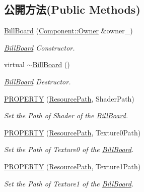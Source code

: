 \subsection*{公開方法(Public Methods)}
\begin{DoxyCompactItemize}
\item 
\hyperlink{class_i_dream_sky_1_1_bill_board_a484900d8c24d851cfccf6b435886a2a4}{Bill\+Board} (\hyperlink{class_i_dream_sky_1_1_component_1_1_owner}{Component\+::\+Owner} \&owner\+\_\+)
\begin{DoxyCompactList}\small\item\em \hyperlink{class_i_dream_sky_1_1_bill_board}{Bill\+Board} Constructor. \end{DoxyCompactList}\item 
virtual \hyperlink{class_i_dream_sky_1_1_bill_board_ab84fd0e03cde0a0f6444cc9d601bd99f}{$\sim$\+Bill\+Board} ()
\begin{DoxyCompactList}\small\item\em \hyperlink{class_i_dream_sky_1_1_bill_board}{Bill\+Board} Destructor. \end{DoxyCompactList}\item 
\hyperlink{class_i_dream_sky_1_1_bill_board_a023a1f651b53eb2f2888b62810c4dc57}{P\+R\+O\+P\+E\+R\+TY} (\hyperlink{class_i_dream_sky_1_1_resource_path}{Resource\+Path}, Shader\+Path)
\begin{DoxyCompactList}\small\item\em Set the Path of Shader of the \hyperlink{class_i_dream_sky_1_1_bill_board}{Bill\+Board}. \end{DoxyCompactList}\item 
\hyperlink{class_i_dream_sky_1_1_bill_board_a40f130cb61a2a0ed143d64f35288f5dd}{P\+R\+O\+P\+E\+R\+TY} (\hyperlink{class_i_dream_sky_1_1_resource_path}{Resource\+Path}, Texture0\+Path)
\begin{DoxyCompactList}\small\item\em Set the Path of Texture0 of the \hyperlink{class_i_dream_sky_1_1_bill_board}{Bill\+Board}. \end{DoxyCompactList}\item 
\hyperlink{class_i_dream_sky_1_1_bill_board_a279538a790562d64c5c574b7e38d1db1}{P\+R\+O\+P\+E\+R\+TY} (\hyperlink{class_i_dream_sky_1_1_resource_path}{Resource\+Path}, Texture1\+Path)
\begin{DoxyCompactList}\small\item\em Set the Path of Texture1 of the \hyperlink{class_i_dream_sky_1_1_bill_board}{Bill\+Board}. \end{DoxyCompactList}\item 

\end{DoxyCompactItemize}
